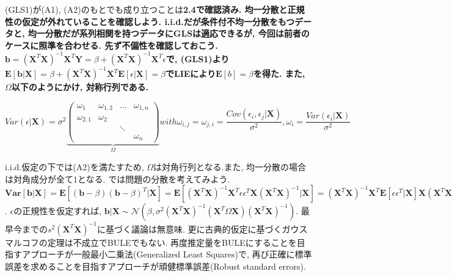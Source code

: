 \documentclass[paper=a4paper,fontsize=10pt]{jlreq}
\begin{document}
(GLS1)が(A1), (A2)のもとでも成り立つことは\rmfamily\mcfamily\bfseries{2.4}\mdseries で確認済み. 均一分散と正規性の仮定が外れていることを確認しよう. i.i.d.だが条件付不均一分散をもつデータと, 均一分散だが系列相関を持つデータにGLSは適応できるが, 今回は前者のケースに照準を合わせる. 先ず不偏性を確認しておこう. $\mathbf{b}=(\mathbf{X}^{T}\mathbf{X})^{-1}\mathbf{X}^{T}\mathbf{Y}=\beta+(\mathbf{X}^{T}\mathbf{X})^{-1}\mathbf{X}^{T}\epsilon$で, (GLS1)より$\mathbf{E}[\mathbf{b}|\mathbf{X}]=\beta+(\mathbf{X}^{T}\mathbf{X})^{-1}\mathbf{X}^{T}\mathbf{E}[\epsilon|\mathbf{X}]=\beta$でLIEにより$\mathbf{E}[b]=\beta$を得た. また, $\Omega$以下のようにかけ, 対称行列である.

\begin{equation*}
  Var(\epsilon|\mathbf{X})
  =\sigma^2
  \underset{\Omega}{\underbrace{
  \begin{pmatrix}
    \omega_{1}&\omega_{1,2}&\dots&\omega_{1,n}\\
    \omega_{2,1}&\omega_{2}\\
    &&\ddots\\
    &&&\omega_{n}
 \end{pmatrix}
  }}
 　with　\omega_{i,j}=\omega_{j,i}=\frac{Cov(\epsilon_i,\epsilon_j|\mathbf{X})}{\sigma^2}, \omega_i=\frac{Var(\epsilon_i|\mathbf{X})}{\sigma^2}
\end{equation*}

i.i.d.仮定の下では(A2)を満たすため, $\Omega$は対角行列となる.また, 均一分散の場合は対角成分が全て$1$となる. では問題の分散を考えてみよう. $\mathbf{Var}[\mathbf{b}|\mathbf{X}]=\mathbf{E}[(\mathbf{b}-\beta)(\mathbf{b}-\beta)^T|\mathbf{X}]=\mathbf{E}[(\mathbf{X}^{T}\mathbf{X})^{-1}\mathbf{X}^{T}\epsilon\epsilon^T\mathbf{X}(\mathbf{X}^{T}\mathbf{X})^{-1}|\mathbf{X}]=(\mathbf{X}^{T}\mathbf{X})^{-1}\mathbf{X}^{T}\mathbf{E}[\epsilon\epsilon^T|\mathbf{X}]\mathbf{X}(\mathbf{X}^{T}\mathbf{X})^{-1}=\sigma^2(\mathbf{X}^{T}\mathbf{X})^{-1}(\mathbf{X}^{T}\Omega\mathbf{X})(\mathbf{X}^{T}\mathbf{X})^{-1}$. $\epsilon$の正規性を仮定すれば, $\mathbf{b}|\mathbf{X} \sim \mathcal{N}(\beta, \sigma^2(\mathbf{X}^{T}\mathbf{X})^{-1}(\mathbf{X}^{T}\Omega\mathbf{X})(\mathbf{X}^{T}\mathbf{X})^{-1})$. 最早今までの$s^2(\mathbf{X}^{T}\mathbf{X})^{-1}$に基づく議論は無意味. 更に古典的仮定に基づくガウスマルコフの定理は不成立でBULEでもない. 再度推定量をBULEにすることを目指すアプローチが一般最小二乗法(Generalized Least Squares)で, 再び正確に標準誤差を求めることを目指すアプローチが頑健標準誤差(Robust standard errors).\\
\end{document}
